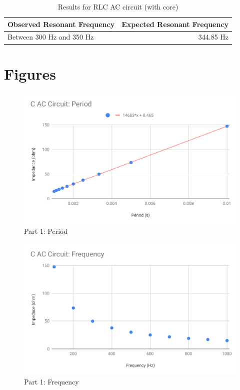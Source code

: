 %
\begin{table}[ht]
	\begin{center}
		\begin{tabular}{l|r}
			Observed Resonant Frequency & Expected Resonant Frequency \\
			\hline
			Between 300 Hz and 350 Hz & 344.85 Hz \\
			\hline
		\end{tabular}
	\end{center}
	\caption{Results for RLC AC circuit (with core)}
	\label{table.results.RLCcore}
\end{table}
%
\newpage
\FloatBarrier
\section{Figures}
%
\begin{figure}[ht]
	\centering
	\includegraphics[scale=0.74]{image/06-RLC/part-1-f.pdf}
	\caption{Part 1: Period}
	\label{figure.06.part.1.f}
\end{figure}
%
\begin{figure}[ht]
	\centering
	\includegraphics[scale=0.74]{image/06-RLC/part-1-T.pdf}
	\caption{Part 1: Frequency}
	\label{figure.06.part.1.T}
\end{figure}
